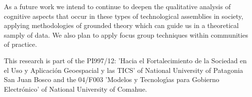 \documentclass[10pt,twocolumn,ieeetran]{article}
\begin{document}


As a future work we intend to continue to deepen the qualitative analysis of cognitive aspects that occur in these types of technological assemblies in society, applying methodologies of grounded theory which can guide us in a theoretical samply of data. We also plan to apply focus group techniques within communities of practice.



\noindent This research is part of the PI997/12: 'Hacia el Fortalecimiento de la Sociedad en el Uso y Aplicaci\' on Geoespacial y las TICS' of National University of Patagonia San Juan Bosco and the 04/F003 'Modelos y Tecnolog\' {\i}as para Gobierno Electr\' onico' of National University of Comahue.



\end{document}
